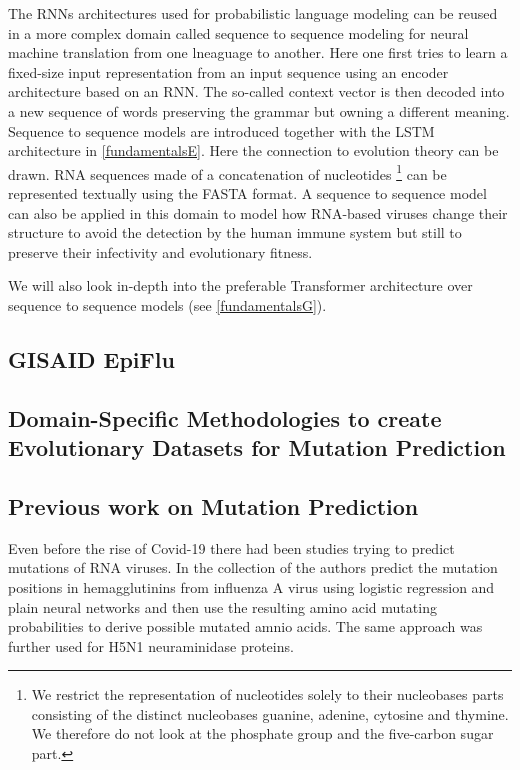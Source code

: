 The \acp{RNN} architectures used for probabilistic language modeling can be reused in a more complex domain called sequence to sequence modeling for neural machine translation from one lneaguage to another. Here one first tries to learn a fixed-size input representation from an input sequence using an encoder architecture based on an \ac{RNN}. The so-called context vector is then decoded into a new sequence of words preserving the grammar but owning a different meaning. Sequence to sequence models are introduced together with the \ac{LSTM} architecture in \autoref{fundamentalsE}. Here the connection to evolution theory can be drawn. \ac{RNA} sequences made of a concatenation of nucleotides \footnote{We restrict the representation of nucleotides solely to their nucleobases parts consisting of the distinct nucleobases guanine, adenine, cytosine and thymine. We therefore do not look at the phosphate group and the five-carbon sugar part.} can be represented textually using the FASTA format. A sequence to sequence model can also be applied in this domain to model how \ac{RNA}-based viruses change their structure to avoid the detection by the human immune system but still to preserve their infectivity and evolutionary fitness. 

We will also look in-depth into the preferable Transformer architecture over sequence to sequence models (see \autoref{fundamentalsG}). 

\subsection{GISAID EpiFlu} \label{fundamentalsB}

\subsection{Domain-Specific Methodologies to create Evolutionary  Datasets for Mutation Prediction} \label{fundamentalsC}

\subsection{Previous work on Mutation Prediction} \label{fundamentalsD}


Even before the rise of Covid-19 there had been studies trying to predict mutations of RNA viruses. In the collection of \cite{Wu2007, Yan2007, Wu2008} the authors predict the mutation positions in hemagglutinins from influenza A virus using logistic regression and plain neural networks and then use the resulting amino acid mutating probabilities to derive possible mutated amnio acids. The same approach was further used for H5N1 neuraminidase proteins. 

